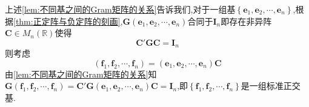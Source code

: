 \begin{red}
    \begin{remark}
        上述\cref{lem:不同基之间的Gram矩阵的关系}告诉我们,对于一组基$\left\{
            \bm{e}_1,\bm{e}_2,\cdots,\bm{e}_n
        \right\}$,根据\cref{thm:正定阵与负定阵的刻画},$\bm{G}\left(
            \bm{e}_1,\bm{e}_2,\cdots,\bm{e}_n
        \right)$合同于$\bm{I}_n$即存在非异阵$\bm{C}\in M_n\left(\mathbb{R}\right)$使得\[\bm{C}'\bm{G}\bm{C}=\bm{I}_n
        \]则考虑\[
        \left(
            \bm{f}_1,\bm{f}_2,\cdots,\bm{f}_n
        \right)=\left(
            \bm{e}_1,\bm{e}_2,\cdots,\bm{e}_n
        \right)\bm{C}
        \]由\cref{lem:不同基之间的Gram矩阵的关系}知$\bm{G}\left(
            \bm{f}_1,\bm{f}_2,\cdots,\bm{f}_n
        \right)=\bm{C}'\bm{G}\left(
            \bm{e}_1,\bm{e}_2,\cdots,\bm{e}_n
        \right)\bm{C}=\bm{I}_n$,即$\left\{
            \bm{f}_1,\bm{f}_2,\cdots,\bm{f}_n
        \right\}$是一组标准正交基.
    \end{remark}
\end{red}

